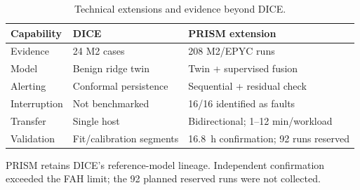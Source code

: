 \begin{table}[!t]
\centering
\caption{Technical extensions and evidence beyond DICE.}
\label{tab:dice_prism_extension}
{\scriptsize
\setlength{\tabcolsep}{2pt}
\renewcommand{\arraystretch}{1.08}
\begin{tabular*}{\columnwidth}{@{\extracolsep{\fill}}lll@{}}
\toprule
\textbf{Capability} &
\textbf{DICE~\cite{ni2026dice}} &
\textbf{PRISM extension} \\
\midrule
Evidence     & 24 M2 cases             & 208 M2/EPYC runs \\
Model        & Benign ridge twin       & Twin + supervised fusion \\
Alerting     & Conformal persistence   & Sequential + residual check \\
Interruption & Not benchmarked         & 16/16 identified as faults \\
Transfer     & Single host             & Bidirectional; 1--12 min/workload \\
Validation & Fit/calibration segments & 16.8~h confirmation; 92 runs reserved \\
\bottomrule
\end{tabular*}
}

\vspace{2pt}
{\scriptsize\raggedright
PRISM retains DICE's reference-model lineage. Independent confirmation
exceeded the FAH limit; the 92 planned reserved runs were not collected.
\par}
\end{table}
